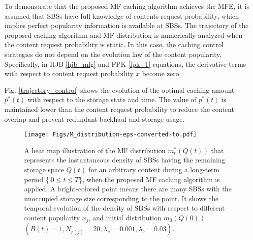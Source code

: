 \documentclass{book}
\begin{document}
            
            
            
            To demonstrate that the proposed MF caching algorithm achieves the MFE, it is assumed that SBSs have full knowledge of contents request probability, which implies perfect popularity information is available at SBSs.
            The trajectory of the proposed caching algorithm and MF distribution is numerically analyzed when the content request probability is static. 
            In this case,  the caching control strategies do not depend on the evolution law of the content popularity. 
            Specifically, in HJB \eqref{hjb_mfg}  and FPK \eqref{fpk_1} equations, the derivative terms with respect to  content request probability $x$ become zero.
            
            
            
            
            
            
            Fig. \ref{trajectory_control} shows the evolution of the optimal caching amount $p^*(t)$ with respect to the storage state and time. The value of $p^*(t)$ is maintained lower than the content request probability to reduce the content overlap and prevent redundant backhaul and storage usage. 
            
            
            \begin{figure*}[ht]
            \centering
            \texttt{[image: Figs/M\_distribution-eps-converted-to.pdf]} 
            \caption{{\small A heat map illustration of the MF distribution $m_t^*(Q(t))$ that represents the instantaneous density of SBSs having the remaining storage space $Q(t)$  for an arbitrary content during a long-term period $\{\ 0\leq t \leq T\}$, when the proposed MF caching algorithm is applied. 
            A bright-colored point means there are many SBSs with the unoccupied storage size corresponding to the point.
            It shows the temporal evolution of the density of SBSs  with respect to different content popularity $x_j$, and initial distribution $m_0(Q(0))$ $(B(t)=1,N_{r(j)}=20, \lambda_u=0.001,\lambda_b=0.03)$.}}\label{MF_dist_total} 
            \end{figure*}
            
\end{document}
